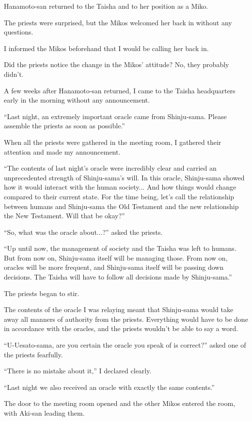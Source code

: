 Hanamoto-san returned to the Taisha and to her position as a Miko.

The priests were surprised, but the Mikos welcomed her back in without any questions.

I informed the Mikos beforehand that I would be calling her back in.

Did the priests notice the change in the Mikos' attitude? No, they probably didn't.

A few weeks after Hanamoto-san returned, I came to the Taisha headquarters early in the morning without any announcement.

``Last night, an extremely important oracle came from Shinju-sama. Please assemble the priests as soon as possible.''

When all the priests were gathered in the meeting room, I gathered their attention and made my announcement.

``The contents of last night's oracle were incredibly clear and carried an unprecedented strength of Shinju-sama's will. In this oracle, Shinju-sama showed how it would interact with the human society... And how things would change compared to their current state. For the time being, let's call the relationship between humans and Shinju-sama the Old Testament and the new relationship the New Testament. Will that be okay?''

``So, what was the oracle about...?'' asked the priests.

``Up until now, the management of society and the Taisha was left to humans. But from now on, Shinju-sama itself will be managing those. From now on, oracles will be more frequent, and Shinju-sama itself will be passing down decisions. The Taisha will have to follow all decisions made by Shinju-sama.''

The priests began to stir.

The contents of the oracle I was relaying meant that Shinju-sama would take away all manners of authority from the priests. Everything would have to be done in accordance with the oracles, and the priests wouldn't be able to say a word.

``U-Uesato-sama, are you certain the oracle you speak of is correct?'' asked one of the priests fearfully.

``There is no mistake about it,'' I declared clearly.

``Last night we also received an oracle with exactly the same contents.''

The door to the meeting room opened and the other Mikos entered the room, with Aki-san leading them.

